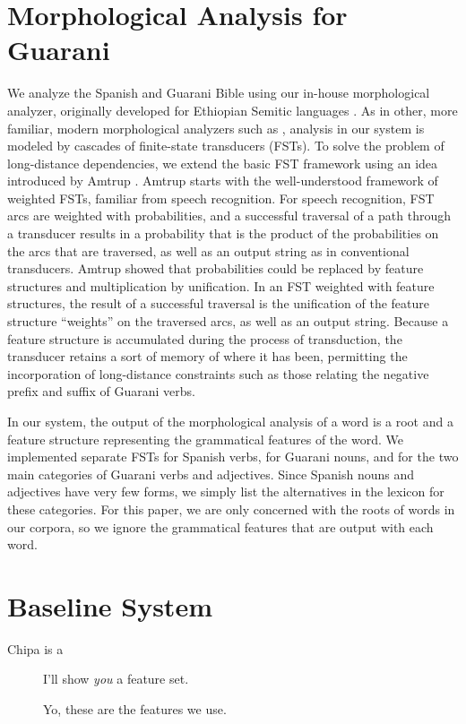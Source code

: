 \section{Morphological Analysis for Guarani}
\label{sec:guaranima}
We analyze the Spanish and Guarani Bible using our in-house morphological
analyzer, originally developed for Ethiopian Semitic languages 
\cite{gasser:eacl09}.
As in other, more familiar, modern
morphological analyzers such as \cite{beesley+karttunen}, analysis in our
system is modeled by cascades of finite-state transducers (FSTs).  To solve the
problem of long-distance dependencies, we extend the basic FST framework using
an idea introduced by Amtrup \cite{amtrup:03}.  Amtrup starts with the
well-understood framework of weighted FSTs, familiar from speech recognition.
For speech recognition, FST arcs are weighted with probabilities, and a
successful traversal of a path through a transducer results in a probability
that is the product of the probabilities on the arcs that are traversed, as
well as an output string as in conventional transducers.  Amtrup showed that
probabilities could be replaced by feature structures and multiplication by
unification.  In an FST weighted with feature structures, the result of a
successful traversal is the unification of the feature structure ``weights'' on
the traversed arcs, as well as an output string.  Because a feature structure
is accumulated during the process of transduction, the transducer retains a
sort of memory of where it has been, permitting the incorporation of
long-distance constraints such as those relating the negative prefix and suffix
of Guarani verbs.

In our system, the output of the morphological analysis of a word is a root and
a feature structure representing the grammatical features of the word.  We
implemented separate FSTs for Spanish verbs, for Guarani nouns, and for the two
main categories of Guarani verbs and adjectives.  Since Spanish nouns and
adjectives have very few forms, we simply list the alternatives in the lexicon
for these categories.  For this paper, we are only concerned with the roots of
words in our corpora, so we ignore the grammatical features that are output
with each word.

\section{Baseline System}
Chipa is a 

\begin{figure*}
  \begin{centering}
  I'll show \emph{you} a feature set.
  \end{centering}
  \caption{Yo, these are the features we use.}
  \label{fig:baselinefeatures}
\end{figure*}



